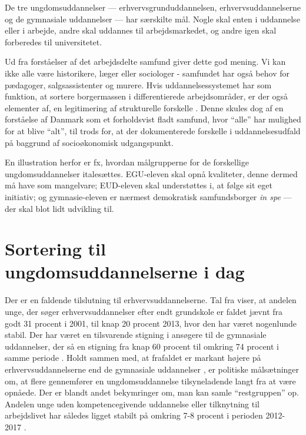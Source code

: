 De tre ungdomsuddannelser --- erhvervsgrunduddannelsen, erhvervsuddannelserne og de gymnasiale uddannelser —  har særskilte mål. Nogle skal enten i uddannelse eller i arbejde, andre skal uddannes til arbejdsmarkedet, og andre igen skal forberedes til universitetet.

Ud fra forståelser af det arbejdsdelte samfund giver dette god mening.
Vi kan ikke alle være historikere, læger eller sociologer - samfundet har også behov for pædagoger, salgsassistenter og murere.
Hvis uddannelsessystemet har som funktion, at sortere borgermassen i differentierede arbejdsområder, er der også elementer af, en legitimering af strukturelle forskelle .
Denne  skules dog af en forståelse af Danmark som et forholdsvist fladt samfund, hvor “alle” har mulighed for at blive “alt”, til trods for, at der dokumenterede forskelle i uddannelsesudfald på baggrund af socioøkonomisk udgangspunkt.

En illustration herfor er fx, hvordan målgrupperne for de forskellige ungdomsuddannelser italesættes.
EGU-eleven skal opnå kvaliteter, denne dermed må have som mangelvare; EUD-eleven skal understøttes i, at følge sit eget initiativ; og gymnasie-eleven er nærmest demokratisk samfundsborger \textit{in spe} — der skal blot lidt udvikling til. 

\chapter{Sortering til ungdomsuddannelserne i dag}\label{chap:sorting}

Der er en faldende tilslutning til erhvervsuddannelserne.
Tal fra \citeauthor{borne-ogundervisningsministerietSogning} viser, at andelen unge, der søger erhvervsuddannelser efter endt grundskole er faldet jævnt fra godt 31 procent i 2001, til knap 20 procent 2013, hvor den har været nogenlunde stabil.
Der har været en tilsvarende stigning i ansøgere til de gymnasiale uddannelser, der så en stigning fra knap 60 procent til omkring 74 procent i samme periode \autocite[s 5f]{undervisningsministerietOg10Klasseelevernes2017}.
Holdt sammen med, at frafaldet er markant højere på erhvervsuddannelserne end de gymnasiale uddannelser \autocite{danskegymnasierFuldforelseOgKarakterer2019}, er politiske målsætninger om, at flere gennemfører en ungdomsuddannelse tilsyneladende langt fra at være opnåede.
Der er blandt andet bekymringer om, man kan samle “restgruppen” op.
Andelen unge uden kompetencegivende uddannelse eller tilknytning til arbejdslivet har således ligget stabilt på omkring 7-8 procent i perioden 2012-2017 \autocite[s. 9]{andersenUngeUdenUddannelse2019}.

